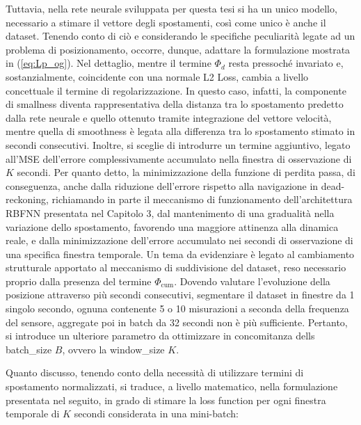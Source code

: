 Tuttavia, nella rete neurale sviluppata per questa tesi si ha un unico modello, necessario a stimare il vettore degli spostamenti, così come unico è anche il dataset. Tenendo conto di ciò e considerando le specifiche peculiarità legate ad un problema di posizionamento, occorre, dunque, adattare la formulazione mostrata in (\ref{eq:Lp_og}). Nel dettaglio, mentre il termine $\Phi_{d}$ resta pressoché invariato e, sostanzialmente, coincidente con una normale L2 Loss, cambia a livello concettuale il termine di regolarizzazione. In questo caso, infatti, la componente di smallness diventa rappresentativa della distanza tra lo spostamento predetto dalla rete neurale e quello ottenuto tramite integrazione del vettore velocità, mentre quella di smoothness è legata alla differenza tra lo spostamento stimato in secondi consecutivi. Inoltre, si sceglie di introdurre un termine aggiuntivo, legato all'MSE dell'errore complessivamente accumulato nella finestra di osservazione di $K$ secondi. Per quanto detto, la minimizzazione della funzione di perdita passa, di conseguenza, anche dalla riduzione dell'errore rispetto alla navigazione in dead-reckoning, richiamando in parte il meccanismo di funzionamento dell'architettura RBFNN presentata nel Capitolo 3, dal mantenimento di una gradualità nella variazione dello spostamento, favorendo una maggiore attinenza alla dinamica reale, e dalla minimizzazione dell'errore accumulato nei secondi di osservazione di una specifica finestra temporale. Un tema da evidenziare è legato al cambiamento strutturale apportato al meccanismo di suddivisione del dataset, reso necessario proprio dalla presenza del termine $\Phi_{\text{cum}}$. Dovendo valutare l'evoluzione della posizione attraverso più secondi consecutivi, segmentare il dataset in finestre da 1 singolo secondo, ognuna contenente 5 o 10 misurazioni a seconda della frequenza del sensore, aggregate poi in batch da 32 secondi non è più sufficiente. Pertanto, si introduce un ulteriore parametro da ottimizzare in concomitanza dells batch\_size $B$, ovvero la window\_size $K$. 

Quanto discusso, tenendo conto della necessità di utilizzare termini di spostamento normalizzati, si traduce, a livello matematico, nella formulazione presentata nel seguito, in grado di stimare la loss function per ogni finestra temporale di $K$ secondi considerata in una mini-batch:

